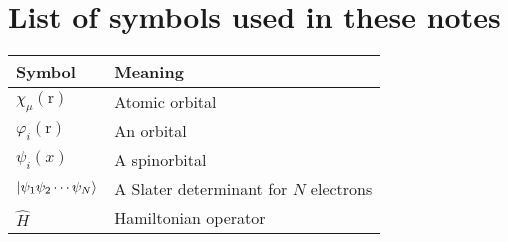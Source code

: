 \documentclass[../Main/chem371-notes.tex]{subfiles}
\begin{document}
\section*{List of symbols used in these notes}
\begin{center}
\begin{tabular}{@{} ll @{}} %
\toprule
Symbol & Meaning \\
\midrule
$\chi_\mu(\mathrm{r})$ & Atomic orbital \\
$\varphi_i(\mathrm{r})$ & An orbital \\
$\psi_i(x)$ & A spinorbital \\
$\ket{\psi_1 \psi_2 \cdots \psi_N}$ & A Slater determinant for $N$ electrons \\
$\hat{H}$ & Hamiltonian operator \\
\bottomrule
\end{tabular}
\end{center}
\end{document}

